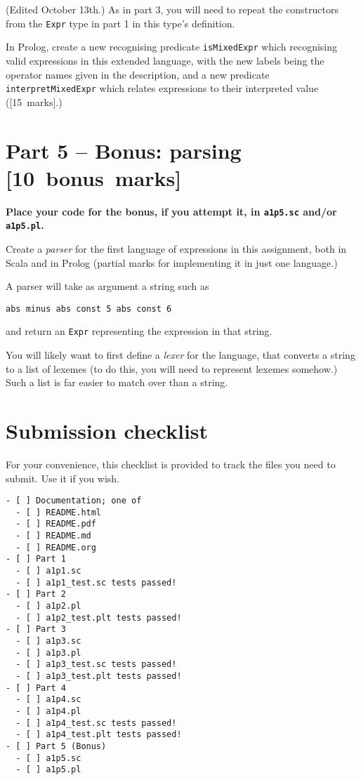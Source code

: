 \documentclass[11pt]{article}
\begin{document}
(Edited October 13th.)
As in part 3, you will need to repeat the constructors from the
\texttt{Expr} type in part 1 in this type's definition.

In Prolog, create a new recognising predicate \texttt{isMixedExpr} which
recognising valid expressions in this extended language,
with the new labels being the operator names given in the description,
and a new predicate \texttt{interpretMixedExpr} which relates
expressions to their interpreted value ([15 marks].)

\section*{Part 5 – Bonus: parsing                [10 bonus marks]}
\label{sec:orgb4388f8}
\begin{center}
\textbf{Place your code for the bonus, if you attempt it, in \texttt{a1p5.sc} and/or \texttt{a1p5.pl}.}
\end{center}

Create a \emph{parser} for the first language of expressions
in this assignment, both in Scala and in Prolog
(partial marks for implementing it in just one language.)

A parser will take as argument a string such as
\begin{verbatim}
abs minus abs const 5 abs const 6
\end{verbatim}
and return an \texttt{Expr} representing the expression in that string.

You will likely want to first define a \emph{lexer} for the language,
that converts a string to a list of lexemes
(to do this, you will need to represent lexemes somehow.)
Such a list is far easier to match over than a string.

\section*{Submission checklist}
\label{sec:orgd4684f9}
For your convenience, this checklist is provided
to track the files you need to submit.
Use it if you wish.
\begin{verbatim}
- [ ] Documentation; one of
  - [ ] README.html
  - [ ] README.pdf
  - [ ] README.md
  - [ ] README.org
- [ ] Part 1
  - [ ] a1p1.sc
  - [ ] a1p1_test.sc tests passed!
- [ ] Part 2
  - [ ] a1p2.pl
  - [ ] a1p2_test.plt tests passed!
- [ ] Part 3
  - [ ] a1p3.sc
  - [ ] a1p3.pl
  - [ ] a1p3_test.sc tests passed!
  - [ ] a1p3_test.plt tests passed!
- [ ] Part 4
  - [ ] a1p4.sc
  - [ ] a1p4.pl
  - [ ] a1p4_test.sc tests passed!
  - [ ] a1p4_test.plt tests passed!
- [ ] Part 5 (Bonus)
  - [ ] a1p5.sc
  - [ ] a1p5.pl
\end{verbatim}
\end{document}
